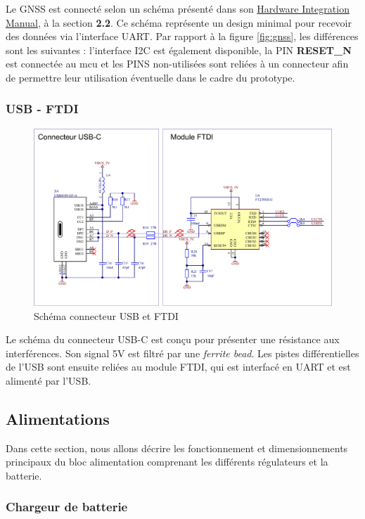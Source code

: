 Le \gls{GNSS} est connecté selon un schéma présenté dans son \href{https://www.u-blox.com/sites/default/files/CAM-M8-FW3_HIM_%28UBX-15030063%29.pdf}{Hardware Integration Manual}, à la section \textbf{2.2}. Ce schéma représente un design minimal pour recevoir des données via l'interface UART. Par rapport à la figure \ref{fig:gnss}, les différences sont les suivantes : l'interface I2C est également disponible, la PIN \textbf{RESET\_N} est connectée au \gls{mcu} et les PINS non-utilisées sont reliées à un connecteur afin de permettre leur utilisation éventuelle dans le cadre du prototype.

\subsubsection{USB - FTDI}

\begin{figure}[h]
	\centering
	\includegraphics[width=.8\linewidth]{../figures/etude/sch/USB-FTDI}
	\caption{Schéma connecteur USB et FTDI}
	\label{fig:usb-ftdi}
\end{figure}

Le schéma du connecteur USB-C est conçu pour présenter une résistance aux interférences. Son signal 5V est filtré par une \textit{ferrite bead}. Les pistes différentielles de l'USB sont ensuite reliées au module \gls{FTDI}, qui est interfacé en UART et est alimenté par l'USB.

\clearpage

\subsection{Alimentations} \label{ssec:Dev-Alim}
Dans cette section, nous allons décrire les fonctionnement et dimensionnements principaux du bloc alimentation comprenant les différents régulateurs et la batterie.

\subsubsection{Chargeur de batterie} \label{sssec:Chargeur-bat}

